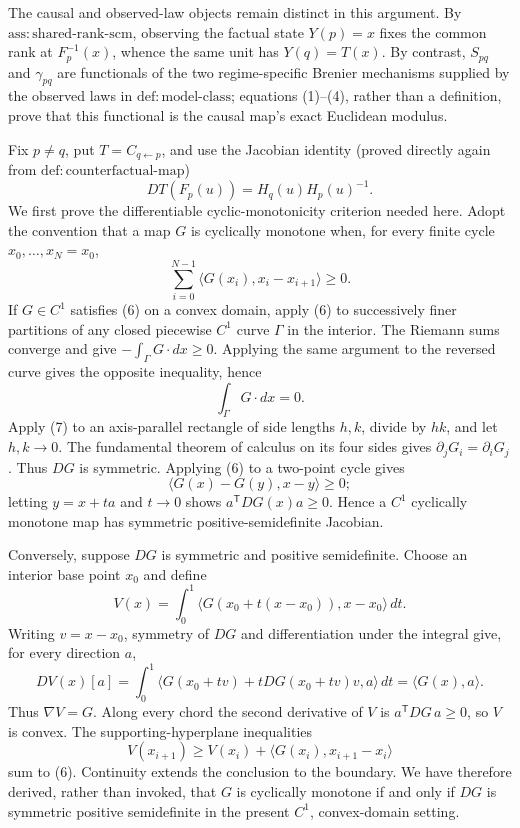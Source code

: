 The causal and observed-law objects remain distinct in this argument.  By \(\mathrm{ass:shared\text{-}rank\text{-}scm}\), observing the factual state \(Y(p)=x\) fixes the common rank at \(F_p^{-1}(x)\), whence the same unit has \(Y(q)=T(x)\).  By contrast, \(S_{pq}\) and \(\gamma_{pq}\) are functionals of the two regime-specific Brenier mechanisms supplied by the observed laws in \(\mathrm{def:model\text{-}class}\); equations (1)--(4), rather than a definition, prove that this functional is the causal map's exact Euclidean modulus.

Fix \(p\ne q\), put \(T=C_{q\leftarrow p}\), and use the Jacobian identity (proved directly again from \(\mathrm{def:counterfactual\text{-}map}\))
\[
 DT(F_p(u))=H_q(u)H_p(u)^{-1}.
 \tag{5}
\]
We first prove the differentiable cyclic-monotonicity criterion needed here.  Adopt the convention that a map \(G\) is cyclically monotone when, for every finite cycle \(x_0,\ldots,x_N=x_0\),
\[
 \sum_{i=0}^{N-1}\langle G(x_i),x_i-x_{i+1}\rangle\ge0.
 \tag{6}
\]
If \(G\in C^1\) satisfies (6) on a convex domain, apply (6) to successively finer partitions of any closed piecewise \(C^1\) curve \(\Gamma\) in the interior.  The Riemann sums converge and give \(-\int_\Gamma G\cdot dx\ge0\).  Applying the same argument to the reversed curve gives the opposite inequality, hence
\[
 \int_\Gamma G\cdot dx=0.
 \tag{7}
\]
Apply (7) to an axis-parallel rectangle of side lengths \(h,k\), divide by \(hk\), and let \(h,k\to0\).  The fundamental theorem of calculus on its four sides gives \(\partial_jG_i=\partial_iG_j\).  Thus \(DG\) is symmetric.  Applying (6) to a two-point cycle gives
\[
 \langle G(x)-G(y),x-y\rangle\ge0;
\]
letting \(y=x+ta\) and \(t\to0\) shows \(a^{\mathsf T}DG(x)a\ge0\).  Hence a \(C^1\) cyclically monotone map has symmetric positive-semidefinite Jacobian.

Conversely, suppose \(DG\) is symmetric and positive semidefinite.  Choose an interior base point \(x_0\) and define
\[
 V(x)=\int_0^1\langle G(x_0+t(x-x_0)),x-x_0\rangle\,dt.
\]
Writing \(v=x-x_0\), symmetry of \(DG\) and differentiation under the integral give, for every direction \(a\),
\[
 DV(x)[a]
 =\int_0^1\langle G(x_0+tv)+tDG(x_0+tv)v,a\rangle\,dt
 =\langle G(x),a\rangle.
 \tag{8}
\]
Thus \(\nabla V=G\).  Along every chord the second derivative of \(V\) is \(a^{\mathsf T}DG\,a\ge0\), so \(V\) is convex.  The supporting-hyperplane inequalities
\[
 V(x_{i+1})\ge V(x_i)+\langle G(x_i),x_{i+1}-x_i\rangle
\]
sum to (6).  Continuity extends the conclusion to the boundary.  We have therefore derived, rather than invoked, that \(G\) is cyclically monotone if and only if \(DG\) is symmetric positive semidefinite in the present \(C^1\), convex-domain setting.

